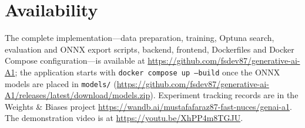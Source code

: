 \documentclass[conference]{IEEEtran}
\newcommand{\repourl}{https://github.com/fsdev87/generative-ai-A1}
\begin{document}
\section*{Availability}

The complete implementation---data preparation, training, Optuna search,
evaluation and ONNX export scripts, backend, frontend, Dockerfiles and Docker
Compose configuration---is available at \url{\repourl}; the application starts
with \texttt{docker compose up --build} once the ONNX models are placed in
\texttt{models/} (\url{https://github.com/fsdev87/generative-ai-A1/releases/latest/download/models.zip}). Experiment
tracking records are in the Weights \& Biases project
\url{https://wandb.ai/mustafafaraz87-fast-nuces/genai-a1}. The demonstration video
is at \url{https://youtu.be/XhPP4m8TGJU}.



\end{document}
